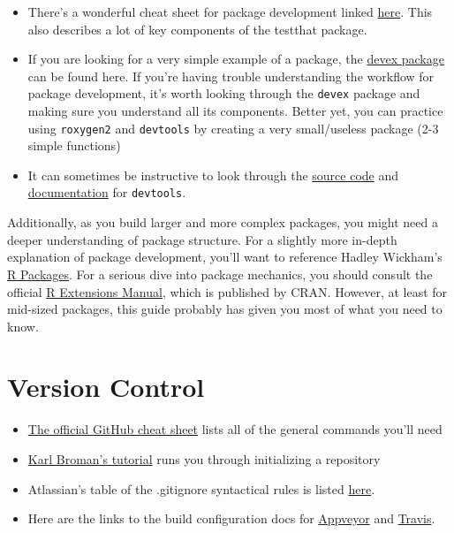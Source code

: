 \documentclass[]{book}
\providecommand{\tightlist}{%
  \setlength{\itemsep}{0pt}\setlength{\parskip}{0pt}}
\begin{document}
\begin{itemize}
\tightlist
\item
  There's a wonderful cheat sheet for package development linked
  \href{https://www.rstudio.com/wp-content/uploads/2015/06/devtools-cheatsheet.pdf}{here}.
  This also describes a lot of key components of the testthat package.
\item
  If you are looking for a very simple example of a package, the
  \href{https://github.com/IQSS/Rbuild/tree/master/devex}{devex package}
  can be found here. If you're having trouble understanding the workflow
  for package development, it's worth looking through the \texttt{devex}
  package and making sure you understand all its components. Better yet,
  you can practice using \texttt{roxygen2} and \texttt{devtools} by
  creating a very small/useless package (2-3 simple functions)
\item
  It can sometimes be instructive to look through the
  \href{https://www.rdocumentation.org/packages/devtools/versions/1.13.3/source}{source
  code} and
  \href{https://www.rdocumentation.org/packages/devtools/versions/1.13.3}{documentation}
  for \texttt{devtools}.
\end{itemize}

Additionally, as you build larger and more complex packages, you might
need a deeper understanding of package structure. For a slightly more
in-depth explanation of package development, you'll want to reference
Hadley Wickham's \href{http://r-pkgs.had.co.nz/}{R Packages}. For a
serious dive into package mechanics, you should consult the official
\href{https://cran.r-project.org/doc/manuals/R-exts.html\#Creating-R-packages}{R
Extensions Manual}, which is published by CRAN. However, at least for
mid-sized packages, this guide probably has given you most of what you
need to know.

\section{Version Control}\label{version-control-1}

\begin{itemize}
\tightlist
\item
  \href{https://github.github.com/training-kit/downloads/github-git-cheat-sheet.pdf}{The
  official GitHub cheat sheet} lists all of the general commands you'll
  need
\item
  \href{http://kbroman.org/github_tutorial/pages/init.html}{Karl
  Broman's tutorial} runs you through initializing a repository
\item
  Atlassian's table of the .gitignore syntactical rules is listed
  \href{https://www.atlassian.com/git/tutorials/gitignore}{here}.
\item
  Here are the links to the build configuration docs for
  \href{https://www.appveyor.com/docs/build-configuration/}{Appveyor}
  and \href{https://docs.travis-ci.com/user/languages/r/}{Travis}.
\end{itemize}
\end{document}
